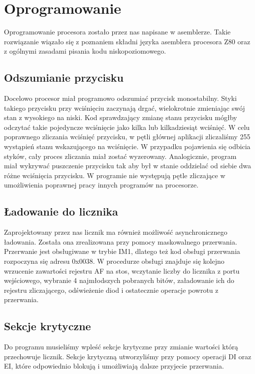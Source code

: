 \documentclass[a4paper,titlepage,11pt,floatssmall]{mwrep}
\begin{document}
\section{Oprogramowanie}

\indent{} Oprogramowanie procesora zostało przez nas napisane w asemblerze. Takie rozwiązanie wiązało się z poznaniem składni języka asemblera procesora Z80 oraz z ogólnymi zasadami pisania kodu niskopoziomowego. 
\subsection{Odszumianie przycisku}
\indent{} Docelowo procesor miał programowo odszumiać przycisk monostabilny. Styki takiego przycisku przy wciśnięciu zaczynają drgać, wielokrotnie zmieniając swój stan z wysokiego na niski. Kod sprawdzający zmianę stanu przycisku mógłby odczytać takie pojedyncze wciśnięcie jako kilka lub kilkadziesiąt wciśnięć. W celu poprawnego zliczania wciśnięć przycisku, w pętli głównej aplikacji zliczaliśmy 255 wystąpień stanu wskazującego na wciśnięcie. W przypadku pojawienia się odbicia styków, cały proces zliczania miał zostać  wyzerowany. Analogicznie, program miał wykrywać puszczenie przycisku tak aby był w stanie oddzielać od siebie dwa różne wciśnięcia przycisku. W programie nie występują pętle zliczające w umożliwienia poprawnej pracy innych programów na procesorze.
\subsection{Ładowanie do licznika}
\indent{} Zaprojektowany przez nas licznik ma również możliwość asynchronicznego ładowania. Została ona zrealizowana przy pomocy maskowalnego przerwania. Przerwanie jest obsługiwane w trybie IM1, dlatego też kod obsługi przerwania rozpoczyna się adresu 0x0038. W procedurze obsługi znajduje się kolejno wrzucenie zawartości rejestru AF na stos, wczytanie liczby do licznika z portu wejściowego, wybranie 4 najmłodszych pobranych bitów, załadowanie ich do rejestru zliczającego, odświeżenie diod i ostatecznie operacje powrotu z przerwania. 
\subsection{Sekcje krytyczne}
\indent{} Do programu musieliśmy wpleść sekcje krytyczne przy zmianie wartości którą przechowuje licznik. Sekcje krytyczną utworzyliśmy przy pomocy operacji DI oraz EI, które odpowiednio blokują i umożliwiają dalsze przyjecie przerwania. 
\end{document}
